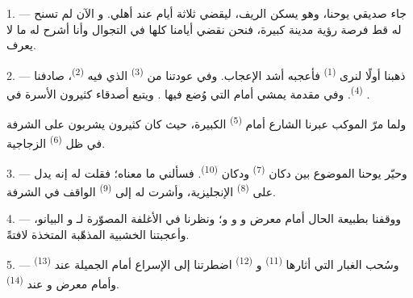
\VUsaut{4.0mm}
\VUsaut{3.0mm}

\VUsaut{3.0mm}

1. --- جاء صديقي يوحنا، وهو يسكن الريف، ليقضي ثلاثة أيام عند أهلي.
و الآن لم تسنح له قط فرصة رؤية مدينة كبيرة، فنحن نقضي أيامنا
كلها في التجوال وأنا أشرح له ما لا يعرف.

2. --- ذهبنا أولًا لنرى  \textsuperscript{(1)} فأعجبه أشد الإعجاب.
وفي عودتنا من  \textsuperscript{(3)} الذي فيه  \textsuperscript{(2)}، صادفنا  \textsuperscript{(4)}. وفي مقدمة
 يمشي  أمام 
التي وُضع فيها . ويتبع أصدقاء كثيرون الأسرة في
.

ولما مرّ الموكب عبرنا الشارع أمام  \textsuperscript{(5)} الكبيرة،
حيث كان  كثيرون يشربون  على الشرفة في ظل
 \textsuperscript{(6)} الزجاجية.

3. --- وحيّر يوحنا  الموضوع بين دكان  \textsuperscript{(7)} ودكان 
\textsuperscript{(10)}. فسألني ما معناه؛ فقلت له إنه يدل على 
\textsuperscript{(8)} الإنجليزية، وأشرت له إلى  \textsuperscript{(9)}
الواقف في الشرفة.

\VUsaut{3.0mm}

4. --- ووقفنا بطبيعة الحال أمام معرض 
و و و؛ ونظرنا
في الأغلفة المصوّرة لـ و البيانو، وأعجبتنا
 الخشبية المذهّبة المتخذة لافتةً.

5. --- وسُحب الغبار التي أثارها  \textsuperscript{(11)}
و \textsuperscript{(12)} اضطرتنا إلى الإسراع أمام
 الجميلة عند  \textsuperscript{(13)}
وأمام معرض  و عند 
\textsuperscript{(14)}.

